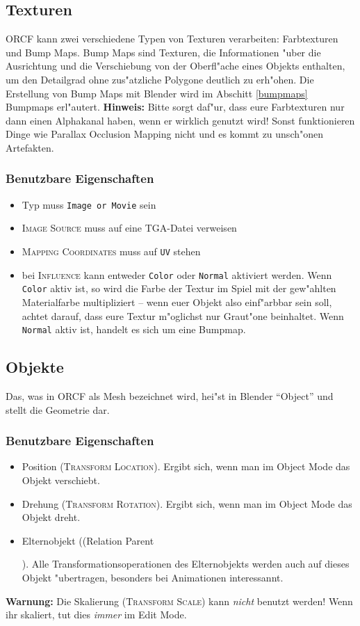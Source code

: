 \documentclass[a4paper]{article}
\newcommand{\ccaption}[1]{\textsc{#1}}
\newcommand{\cvalue}[1]{\texttt{#1}}
\newcommand{\note}[1]{\textbf{Hinweis:} #1 \par}
\newcommand{\warning}[1]{\textbf{Warnung:} #1 \par}
\newcommand{\rarrow}{\textrightarrow}
\begin{document}
\subsection{Texturen}
\label{objects_textures}
ORCF kann zwei verschiedene Typen von Texturen verarbeiten: Farbtexturen und Bump Maps. Bump Maps sind Texturen, die Informationen "uber die Ausrichtung
und die Verschiebung von der Oberfl"ache eines Objekts enthalten, um den Detailgrad ohne zus"atzliche Polygone deutlich zu erh"ohen. Die Erstellung von
Bump Maps mit Blender wird im Abschitt \ref{bumpmaps} Bumpmaps erl"autert.
\note{Bitte sorgt daf"ur, dass eure Farbtexturen nur dann einen Alphakanal haben, wenn er wirklich genutzt wird! Sonst funktionieren Dinge wie Parallax
  Occlusion Mapping nicht und es kommt zu unsch"onen Artefakten.

\subsubsection{Benutzbare Eigenschaften}
\begin{itemize}
\item Typ muss \cvalue{Image or Movie} sein
\item \ccaption{Image \rarrow Source} muss auf eine TGA-Datei verweisen
\item \ccaption{Mapping \rarrow Coordinates} muss auf \cvalue{UV} stehen
\item bei \ccaption{Influence} kann entweder \cvalue{Color} oder \cvalue{Normal} aktiviert werden. Wenn \cvalue{Color} aktiv ist, so wird die Farbe
  der Textur im Spiel mit der gew"ahlten Materialfarbe multipliziert -- wenn euer Objekt also einf"arbbar sein soll, achtet darauf, dass eure Textur
  m"oglichst nur Graut"one beinhaltet. Wenn \cvalue{Normal} aktiv ist, handelt es sich um eine Bumpmap.
\end{itemize}

\subsection{Objekte}
Das, was in ORCF als Mesh bezeichnet wird, hei"st in Blender "`Object"' und stellt die Geometrie dar.

\subsubsection{Benutzbare Eigenschaften}
\begin{itemize}
\item Position (\ccaption{Transform \rarrow Location}). Ergibt sich, wenn man im Object Mode das Objekt verschiebt.
\item Drehung (\ccaption{Transform \rarrow Rotation}). Ergibt sich, wenn man im Object Mode das Objekt dreht.
\item Elternobjekt (\ccaption(Relation \rarrow Parent}). Alle Transformationsoperationen des Elternobjekts werden auch auf dieses Objekt "ubertragen,
  besonders bei Animationen interessannt.
\end{itemize}
\warning{Die Skalierung (\ccaption{Transform \rarrow Scale}) kann \emph{nicht} benutzt werden! Wenn ihr skaliert, tut dies \emph{immer} im Edit Mode.}
\end{document}

